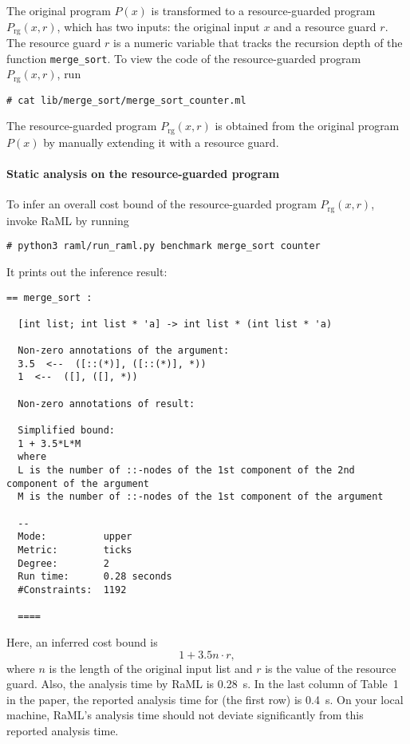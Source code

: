 The original program $P(x)$ is transformed to a resource-guarded program
$P_{\mathrm{rg}}(x, r)$, which has two inputs: the original input $x$ and a
resource guard $r$.
%
The resource guard $r$ is a numeric variable that tracks the recursion depth of
the function \texttt{merge\_sort}.
%
To view the code of the resource-guarded program $P_{\mathrm{rg}}(x, r)$, run
\begin{verbatim}
# cat lib/merge_sort/merge_sort_counter.ml
\end{verbatim}
%
The resource-guarded program $P_{\mathrm{rg}}(x, r)$ is obtained from the
original program $P(x)$ by manually extending it with a resource guard.

\paragraph{Static analysis on the resource-guarded program}

To infer an overall cost bound of the resource-guarded program
$P_{\mathrm{rg}}(x, r)$, invoke RaML by running
\begin{verbatim}
# python3 raml/run_raml.py benchmark merge_sort counter
\end{verbatim}
%
It prints out the inference result:
\begin{Verbatim}[fontsize=\footnotesize]
  == merge_sort :

  [int list; int list * 'a] -> int list * (int list * 'a)

  Non-zero annotations of the argument:
  3.5  <--  ([::(*)], ([::(*)], *))
  1  <--  ([], ([], *))

  Non-zero annotations of result:

  Simplified bound:
  1 + 3.5*L*M
  where
  L is the number of ::-nodes of the 1st component of the 2nd component of the argument
  M is the number of ::-nodes of the 1st component of the argument

  --
  Mode:          upper
  Metric:        ticks
  Degree:        2
  Run time:      0.28 seconds
  #Constraints:  1192

  ====
\end{Verbatim}
%
Here, an inferred cost bound is
\begin{equation}
  1 + 3.5 n \cdot r,
\end{equation}
where $n$ is the length of the original input list and $r$ is the value of the
resource guard.
%
Also, the analysis time by RaML is \qty{0.28}{\second}.
%
In the last column of Table~1 in the paper, the reported analysis time for
\mergesort{} (the first row) is \qty{0.4}{\second}.
%
On your local machine, RaML's analysis time should not deviate significantly
from this reported analysis time.

